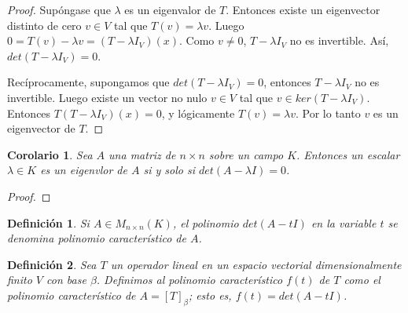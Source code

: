 \documentclass{book}
\newtheorem{definition}{Definición}
\newtheorem{corollary}{Corolario}
\begin{document}
\begin{proof}
Supóngase que $\lambda$ es un eigenvalor de $T$. Entonces existe un eigenvector distinto de cero $v\in V$ tal que $T(v)=\lambda v$. Luego $0=T(v)-\lambda v=(T-\lambda I_{V})(x)$. Como $v\neq 0$, $T-\lambda I_{V}$ no es invertible. Así, $det(T-\lambda I_{V})=0$. 

Recíprocamente, supongamos que $det(T-\lambda I_{V})=0$, entonces $T-\lambda I_{V}$ no es invertible. Luego existe un vector no nulo $v\in V$ tal que $v\in ker(T-\lambda I_{V})$. Entonces $T(T-\lambda I_{V})(x)=0$, y lógicamente $T(v)=\lambda v$. Por lo tanto $v$ es un eigenvector de $T$.
\end{proof}

\begin{corollary}
Sea $A$ una matriz de $n\times n$ sobre un campo $K$. Entonces un escalar $\lambda \in K$ es un eigenvlor de $A$ si y solo si $det(A-\lambda I)=0$.
\end{corollary}

\begin{proof}

\end{proof}

\begin{definition}
Si $A\in M_{n\times n}(K)$, el polinomio $det(A-t I)$ en la variable $t$ se denomina polinomio característico de $A$.
\end{definition}

\begin{definition}
Sea $T$ un operador lineal en un espacio vectorial dimensionalmente finito $V$ con base $\beta$. Definimos al polinomio característico $f(t)$ de $T$ como el polinomio característico de $A=[T]_{\beta}$; esto es, $f(t)=det(A-t I)$.
\end{definition}
\end{document}
